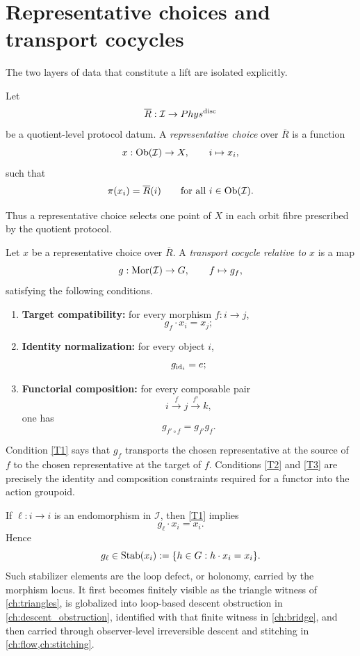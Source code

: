 \section{Representative choices and transport cocycles}
\label{sec:lift-two-loci}
The two layers of data that constitute a lift are isolated explicitly.
\begin{definition}
	Let
	\[
		\overline R:\mathcal I\to Phys^{\mathrm{disc}}
	\]
	be a quotient-level protocol datum.
	A \emph{representative choice} over \(\overline R\) is a function
	\[
		x:\operatorname{Ob}(\mathcal I)\to X,
		\qquad
		i\mapsto x_i,
	\]
	such that
	\[
		\pi(x_i)=\overline R(i)
		\qquad
		\text{for all }i\in\operatorname{Ob}(\mathcal I).
	\]
\end{definition}
Thus a representative choice selects one point of \(X\) in each orbit
fibre prescribed by the quotient protocol.
\begin{definition}
	Let \(x\) be a representative choice over \(\overline R\).
	A \emph{transport cocycle relative to \(x\)} is a map
	\[
		g:\mathrm{Mor}(\mathcal I)\to G,
		\qquad
		f\mapsto g_f,
	\]
	satisfying the following conditions.
	\begin{enumerate}[label=\textup{(T\arabic*)}]
		\item\label{T1}
		      \textbf{Target compatibility:}
		      for every morphism \(f:i\to j\),
		      \[
			      g_f\cdot x_i=x_j;
		      \]
		\item\label{T2}
		      \textbf{Identity normalization:}
		      for every object \(i\),
		      \[
			      g_{\operatorname{id}_i}=e;
		      \]
		\item\label{T3}
		      \textbf{Functorial composition:}
		      for every composable pair
		      \[
			      i\xrightarrow{f}j\xrightarrow{f'}k,
		      \]
		      one has
		      \[
			      g_{f'\circ f}=g_{f'}g_f .
		      \]
	\end{enumerate}
\end{definition}
\begin{remark}
	Condition \textup{\ref{T1}} says that \(g_f\) transports the chosen
	representative at the source of \(f\) to the chosen representative at
	the target of \(f\).
	Conditions \textup{\ref{T2}} and \textup{\ref{T3}} are precisely the
	identity and composition constraints required for a functor into the
	action groupoid.
\end{remark}
\begin{remark}
	If \(\ell:i\to i\) is an endomorphism in \(\mathcal I\), then
	\textup{\ref{T1}} implies
	\[
		g_\ell\cdot x_i=x_i.
	\]
	Hence
	\[
		g_\ell\in \operatorname{Stab}(x_i):=\{h\in G:h\cdot x_i=x_i\}.
	\]
	Such stabilizer elements are the loop defect, or holonomy, carried by
	the morphism locus.
	It first becomes finitely visible as the triangle witness of
	\cref{ch:triangles}, is globalized into loop-based descent
	obstruction in \cref{ch:descent_obstruction}, identified with that
	finite witness in \cref{ch:bridge}, and then carried through
	observer-level irreversible descent and stitching in
	\cref{ch:flow,ch:stitching}.
\end{remark}
